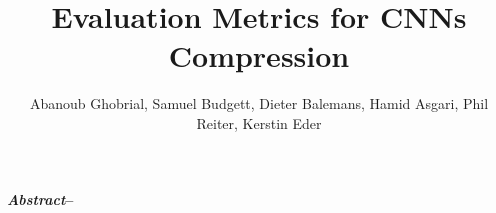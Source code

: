 \documentclass[runningheads,twocolumn,a4paper,10pt]{llncs}
\begin{document}
 

\title{Evaluation Metrics for CNNs Compression}%

\author{Abanoub Ghobrial, Samuel Budgett, Dieter Balemans, Hamid Asgari, Phil Reiter, Kerstin Eder}


\maketitle

%
\makeatletter
\renewcommand\subsubsection{\@startsection{subsubsection}{3}{\z@}%
                       {-18\p@ \@plus -4\p@ \@minus -4\p@}%
                       {4\p@ \@plus 2\p@ \@minus 2\p@}%
                       {\normalfont\normalsize\bfseries\boldmath
                        \rightskip=\z@ \@plus 8em\pretolerance=10000 }}
\makeatother

\textbf{\textit{Abstract}--}



\printbibliography

\end{document}
